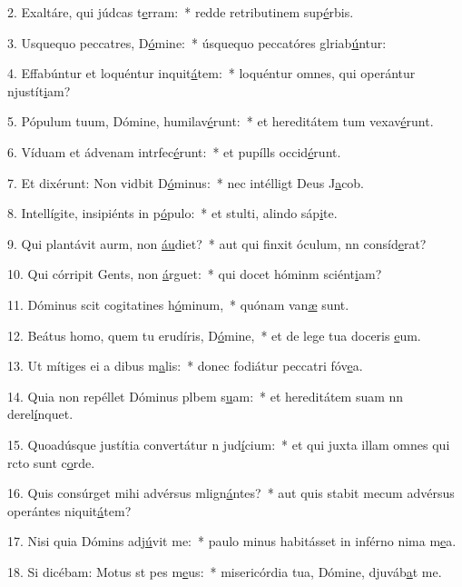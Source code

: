 2. Exaltáre, qui júdcas t\uline{e}rram:~* redde retributinem sup\uline{é}rbis.\par 
3. Usquequo peccatres, D\uline{ó}mine:~* úsquequo peccatóres glriab\uline{ú}ntur:\par 
4. Effabúntur et loquéntur inquit\uline{á}tem:~* loquéntur omnes, qui operántur njustít\uline{i}am?\par 
5. Pópulum tuum, Dómine, humilav\uline{é}runt:~* et hereditátem tum vexav\uline{é}runt.\par 
6. Víduam et ádvenam intrfec\uline{é}runt:~* et pupílls occid\uline{é}runt.\par 
7. Et dixérunt: Non vidbit D\uline{ó}minus:~* nec intélligt Deus J\uline{a}cob.\par 
8. Intellígite, insipiénts in p\uline{ó}pulo:~* et stulti, alindo sáp\uline{i}te.\par 
9. Qui plantávit aurm, non \uline{áu}diet?~* aut qui finxit óculum, nn consíd\uline{e}rat?\par 
10. Qui córripit Gents, non \uline{á}rguet:~* qui docet hóminm sciént\uline{i}am?\par 
11. Dóminus scit cogitatines h\uline{ó}minum,~* quónam van\uline{æ} sunt.\par 
12. Beátus homo, quem tu erudíris, D\uline{ó}mine,~* et de lege tua doceris \uline{e}um.\par 
13. Ut mítiges ei a dibus m\uline{a}lis:~* donec fodiátur peccatri fóv\uline{e}a.\par 
14. Quia non repéllet Dóminus plbem s\uline{u}am:~* et hereditátem suam nn derel\uline{í}nquet.\par 
15. Quoadúsque justítia convertátur n jud\uline{í}cium:~* et qui juxta illam omnes qui rcto sunt c\uline{o}rde.\par 
16. Quis consúrget mihi advérsus mlign\uline{á}ntes?~* aut quis stabit mecum advérsus operántes niquit\uline{á}tem?\par 
17. Nisi quia Dómins adj\uline{ú}vit me:~* paulo minus habitásset in inférno nima m\uline{e}a.\par 
18. Si dicébam: Motus st pes m\uline{e}us:~* misericórdia tua, Dómine, djuváb\uline{a}t me.\par 

